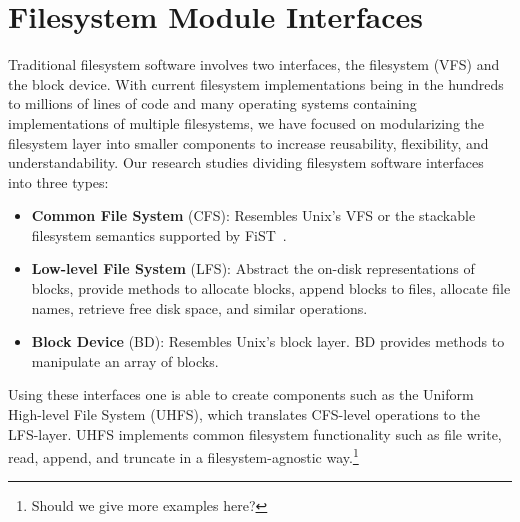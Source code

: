 \section{Filesystem Module Interfaces}
\label{sec:interfaces}

Traditional filesystem software involves two interfaces, the
filesystem (VFS) and the block device. With current filesystem
implementations being in the hundreds to millions of lines of code and
many operating systems containing implementations of multiple
filesystems, we have focused on modularizing the filesystem layer into
smaller components to increase reusability, flexibility, and
understandability. Our research studies dividing filesystem software
interfaces into three types:

\begin{itemize}
\item \itemvspace{} {\bf Common File System} (CFS): Resembles Unix's VFS or the
  stackable filesystem semantics supported by FiST~\cite{zadok00fist}.
\item \itemvspace{} {\bf Low-level File System} (LFS): Abstract the on-disk
  representations of blocks, provide methods to allocate blocks,
  append blocks to files, allocate file names, retrieve free disk
  space, and similar operations.
\item \itemvspace{} {\bf Block Device} (BD): Resembles Unix's block layer. BD
  provides methods to manipulate an array of blocks.
\end{itemize}
\postlistspacing{}

Using these interfaces one is able to create components such as the
Uniform High-level File System (UHFS), which translates CFS-level
operations to the LFS-layer. UHFS implements common filesystem
functionality such as file write, read, append, and truncate in a
filesystem-agnostic way.\footnote{Should we give more examples here?}
